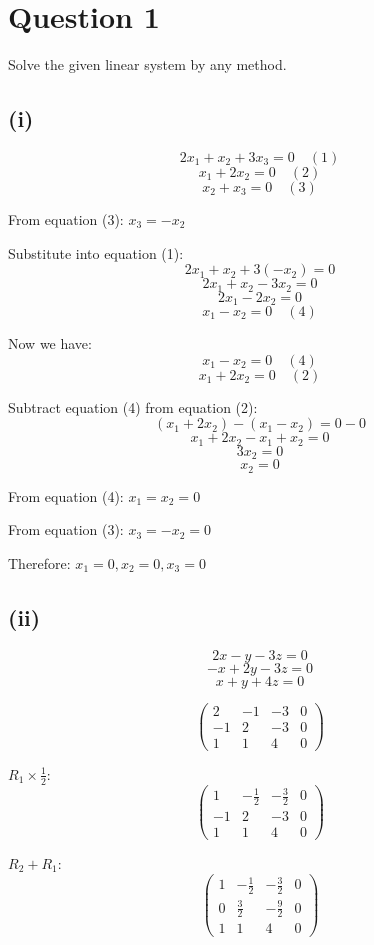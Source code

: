 \documentclass[12pt]{article}
\begin{document}
\section*{Question 1}
Solve the given linear system by any method.

\subsection*{(i)}
\[
	2x_1 + x_2 + 3x_3 = 0 \quad (1)
\]
\[
	x_1 + 2x_2 = 0 \quad (2)
\]
\[
	x_2 + x_3 = 0 \quad (3)
\]

From equation (3): $x_3 = -x_2$

Substitute into equation (1):
\[
	2x_1 + x_2 + 3(-x_2) = 0
\]
\[
	2x_1 + x_2 - 3x_2 = 0
\]
\[
	2x_1 - 2x_2 = 0
\]
\[
	x_1 - x_2 = 0 \quad (4)
\]

Now we have:
\[
	x_1 - x_2 = 0 \quad (4)
\]
\[
	x_1 + 2x_2 = 0 \quad (2)
\]

Subtract equation (4) from equation (2):
\[
	(x_1 + 2x_2) - (x_1 - x_2) = 0 - 0
\]
\[
	x_1 + 2x_2 - x_1 + x_2 = 0
\]
\[
	3x_2 = 0
\]
\[
	x_2 = 0
\]

From equation (4): $x_1 = x_2 = 0$

From equation (3): $x_3 = -x_2 = 0$

Therefore: $x_1 = 0, x_2 = 0, x_3 = 0$

\subsection*{(ii)}
\[
	2x - y - 3z = 0
\]
\[
	-x + 2y - 3z = 0
\]
\[
	x + y + 4z = 0
\]

\[
	\begin{pmatrix}
		2  & -1 & -3 & 0 \\
		-1 & 2  & -3 & 0 \\
		1  & 1  & 4  & 0
	\end{pmatrix}
\]

$R_1 \times \frac{1}{2}$:
\[
	\begin{pmatrix}
		1  & -\frac{1}{2} & -\frac{3}{2} & 0 \\
		-1 & 2           & -3           & 0 \\
		1  & 1           & 4            & 0
	\end{pmatrix}
\]

$R_2 + R_1$:
\[
	\begin{pmatrix}
		1 & -\frac{1}{2} & -\frac{3}{2} & 0 \\
		0 & \frac{3}{2}  & -\frac{9}{2} & 0 \\
		1 & 1           & 4            & 0
	\end{pmatrix}
\]
\end{document}
